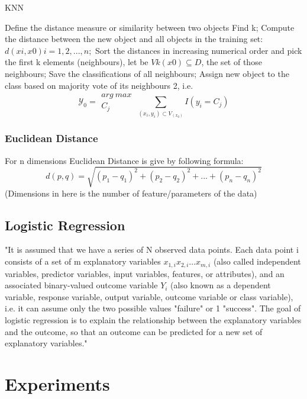 \documentclass[twoside]{article}
\begin{document}
\begin{multicols}{2}
\begin{algorithm*}[t]
\caption{KNN} %
\label{alg:KNN}
\begin{algorithmic} [1]
    \State Define the distance measure or similarity between two objects \label{1}
    \State Find k; \label{KNN-fnd-k}
    \State Compute the distance between the new object and all objects in the training set: $d(xi, x0) i = 1, 2, . . . , n;$
	\State Sort the distances in increasing numerical order and pick the first k elements (neighbours), let be $Vk (x0) \subseteq D$, the set of those neighbours;
    \State Save the classifications of all neighbours;
    \State Assign new object to the class based on majority vote of its
neighbours 2, i.e.	\[	\mathcal{Y}_0 = \substack{arg\ max\ \\ C_j} \sum_{(x_i,y_i)\subset V_(x_0)} I(y_i=C_j) \]
\end{algorithmic}
\end{algorithm*}
\subsubsection*{Euclidean Distance}
For n dimensions Euclidean Distance is give by following formula:
\[ d(p,q)= \sqrt{(p_1 - q_1)^2 + (p_2 - q_2)^2 + ... + (p_n - q_n)^2} \]
(Dimensions in here is the number of feature/parameters of the data)

\subsection*{Logistic Regression}
\indent \par
"It is assumed that we have a series of N observed data points. Each data point i consists of a set of m explanatory variables $x_{1,i} x_{2,i} \dots x_{m,i}$ (also called independent variables, predictor variables, input variables, features, or attributes), and an associated binary-valued outcome variable $Y_i$ (also known as a dependent variable, response variable, output variable, outcome variable or class variable), i.e. it can assume only the two possible values "failure" or 1 "success". The goal of logistic regression is to explain the relationship between the explanatory variables and the outcome, so that an outcome can be predicted for a new set of explanatory variables."



\section{Experiments}

\end{multicols}
\end{document}
